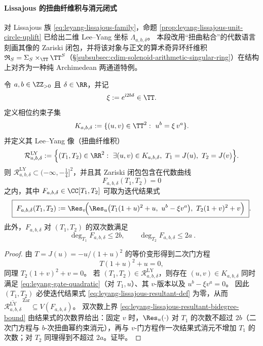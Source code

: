 \paragraph{Lissajous 的扭曲纤维积与消元闭式}
对 Lissajous 族 \eqref{eq:leyang-lissajous-family}，命题 \ref{prop:leyang-lissajous-unit-circle-uplift} 已给出二维 Lee--Yang 坐标 \(\Lambda_{a,b,\delta}\)。
本段改用“扭曲粘合”的代数语言刻画其像的 Zariski 闭包，并将该对象与正文的算术奇异环纤维积 \(\mathfrak{R}_S=\Sigma_S\times_{\TT}\TT^S\)（\S\ref{subsubsec:cdim-solenoid-arithmetic-singular-ring}）在结构上对齐为一种纯 Archimedean 两通道特例。

\begin{theorem}\label{thm:leyang-lissajous-twisted-fiberproduct-resultant}
令 \(a,b\in\ZZ_{>0}\) 且 \(\delta\in\RR\)，并记
\[
\xi:=e^{\mathrm{i}2b\delta}\in\TT.
\]
定义相位约束子集
\begin{equation}\label{eq:leyang-lissajous-Kabdelta}
K_{a,b,\delta}:=\{(u,v)\in\TT^2:\ u^b=\xi\,v^a\}.
\end{equation}
并定义其 Lee--Yang 像（扭曲纤维积）
\[
\mathcal{R}^{\mathrm{LY}}_{a,b,\delta}
:=\Bigl\{(T_1,T_2)\in\RR^2:\ \exists(u,v)\in K_{a,b,\delta},\ T_1=J(u),\ T_2=J(v)\Bigr\}.
\]
则 \(\mathcal{R}^{\mathrm{LY}}_{a,b,\delta}\subset(-\infty,-\tfrac14]^2\)，并且其 Zariski 闭包包含在代数曲线
\begin{equation}\label{eq:leyang-lissajous-resultant-curve}
F_{a,b,\delta}(T_1,T_2)=0
\end{equation}
之内，其中 \(F_{a,b,\delta}\in\CC[T_1,T_2]\) 可取为迭代结果式
\begin{equation}\label{eq:leyang-lissajous-resultant-def}
\boxed{\;
F_{a,b,\delta}(T_1,T_2)
:=\Res_v\!\Bigl(\Res_u\bigl(T_1(1+u)^2+u,\ u^b-\xi v^a\bigr),\ T_2(1+v)^2+v\Bigr)\; } .
\end{equation}
此外，\(F_{a,b,\delta}\) 对 \((T_1,T_2)\) 的双次数满足
\begin{equation}\label{eq:leyang-lissajous-resultant-bidegree-bound}
\boxed{\ \deg_{T_1}F_{a,b,\delta}\le 2b,\qquad \deg_{T_2}F_{a,b,\delta}\le 2a\ }.
\end{equation}
\end{theorem}
\begin{proof}
由 \(T=J(u)=-u/(1+u)^2\) 的等价变形得到二次门方程
\begin{equation}\label{eq:leyang-gate-quadratic}
T(1+u)^2+u=0,
\end{equation}
同理 \(T_2(1+v)^2+v=0\)。
若 \((T_1,T_2)\in\mathcal{R}^{\mathrm{LY}}_{a,b,\delta}\)，则存在 \((u,v)\in K_{a,b,\delta}\) 同时满足 \eqref{eq:leyang-gate-quadratic}（对 \(T_1,u\)）、其 \(v\)-版本以及 \(u^b-\xi v^a=0\)。
因此 \((T_1,T_2)\) 必使迭代结果式 \eqref{eq:leyang-lissajous-resultant-def} 为零，从而 \(\overline{\mathcal{R}^{\mathrm{LY}}_{a,b,\delta}}^{\,\mathrm{Zar}}\subseteq V(F_{a,b,\delta})\)。
双次数上界 \eqref{eq:leyang-lissajous-resultant-bidegree-bound} 由结果式的次数界给出：固定 \(v\) 时，\(\Res_u(\cdot)\) 对 \(T_1\) 的次数不超过 \(2b\)（二次门方程与 \(b\)-次扭曲幂约束消元），再与 \(v\)-门方程作一次结果式消元不增加 \(T_1\) 的次数；对 \(T_2\) 同理得到不超过 \(2a\)。证毕。
\end{proof}

